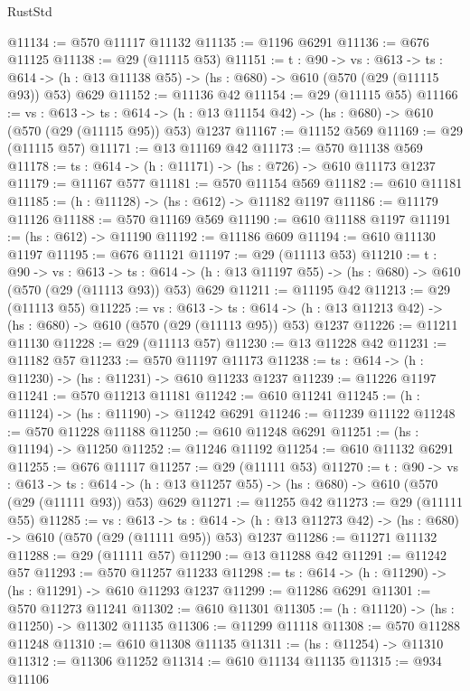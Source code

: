 \begin{lexlean}{RustStd}
\begin{coremodule}
@11134 := @570 @11117 @11132
@11135 := @1196 @6291
@11136 := @676 @11125
@11138 := @29 (@11115 @53)
@11151 := {t : @90} ->
  {vs : @613} ->
  {ts : @614} -> (h : @13 @11138 @55) -> (hs : @680) -> @610 (@570 (@29 (@11115 @93)) @53) @629
@11152 := @11136 @42
@11154 := @29 (@11115 @55)
@11166 := {vs : @613} ->
  {ts : @614} -> (h : @13 @11154 @42) -> (hs : @680) -> @610 (@570 (@29 (@11115 @95)) @53) @1237
@11167 := @11152 @569
@11169 := @29 (@11115 @57)
@11171 := @13 @11169 @42
@11173 := @570 @11138 @569
@11178 := {ts : @614} -> (h : @11171) -> (hs : @726) -> @610 @11173 @1237
@11179 := @11167 @577
@11181 := @570 @11154 @569
@11182 := @610 @11181
@11185 := (h : @11128) -> (hs : @612) -> @11182 @1197
@11186 := @11179 @11126
@11188 := @570 @11169 @569
@11190 := @610 @11188 @1197
@11191 := (hs : @612) -> @11190
@11192 := @11186 @609
@11194 := @610 @11130 @1197
@11195 := @676 @11121
@11197 := @29 (@11113 @53)
@11210 := {t : @90} ->
  {vs : @613} ->
  {ts : @614} -> (h : @13 @11197 @55) -> (hs : @680) -> @610 (@570 (@29 (@11113 @93)) @53) @629
@11211 := @11195 @42
@11213 := @29 (@11113 @55)
@11225 := {vs : @613} ->
  {ts : @614} -> (h : @13 @11213 @42) -> (hs : @680) -> @610 (@570 (@29 (@11113 @95)) @53) @1237
@11226 := @11211 @11130
@11228 := @29 (@11113 @57)
@11230 := @13 @11228 @42
@11231 := @11182 @57
@11233 := @570 @11197 @11173
@11238 := {ts : @614} -> (h : @11230) -> (hs : @11231) -> @610 @11233 @1237
@11239 := @11226 @1197
@11241 := @570 @11213 @11181
@11242 := @610 @11241
@11245 := (h : @11124) -> (hs : @11190) -> @11242 @6291
@11246 := @11239 @11122
@11248 := @570 @11228 @11188
@11250 := @610 @11248 @6291
@11251 := (hs : @11194) -> @11250
@11252 := @11246 @11192
@11254 := @610 @11132 @6291
@11255 := @676 @11117
@11257 := @29 (@11111 @53)
@11270 := {t : @90} ->
  {vs : @613} ->
  {ts : @614} -> (h : @13 @11257 @55) -> (hs : @680) -> @610 (@570 (@29 (@11111 @93)) @53) @629
@11271 := @11255 @42
@11273 := @29 (@11111 @55)
@11285 := {vs : @613} ->
  {ts : @614} -> (h : @13 @11273 @42) -> (hs : @680) -> @610 (@570 (@29 (@11111 @95)) @53) @1237
@11286 := @11271 @11132
@11288 := @29 (@11111 @57)
@11290 := @13 @11288 @42
@11291 := @11242 @57
@11293 := @570 @11257 @11233
@11298 := {ts : @614} -> (h : @11290) -> (hs : @11291) -> @610 @11293 @1237
@11299 := @11286 @6291
@11301 := @570 @11273 @11241
@11302 := @610 @11301
@11305 := (h : @11120) -> (hs : @11250) -> @11302 @11135
@11306 := @11299 @11118
@11308 := @570 @11288 @11248
@11310 := @610 @11308 @11135
@11311 := (hs : @11254) -> @11310
@11312 := @11306 @11252
@11314 := @610 @11134 @11135
@11315 := @934 @11106

\end{coremodule}
\end{lexlean}
